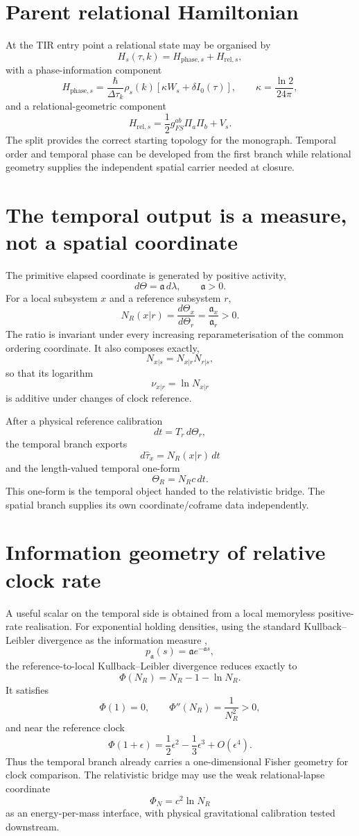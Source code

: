 \section{Parent relational Hamiltonian}

At the TIR entry point a relational state may be organised by
\[
H_s(\tau,k)=H_{\mathrm{phase},s}+H_{\mathrm{rel},s},
\]
with a phase-information component
\[
H_{\mathrm{phase},s}
=
\frac{\hbar}{\Delta\tau_k}\rho_s(k)
\left[\kappa W_s+\delta I_0(\tau)\right],
\qquad
\kappa=\frac{\ln2}{24\pi},
\]
and a relational-geometric component
\[
H_{\mathrm{rel},s}
=
\frac12 g_{FS}^{ab}\Pi_a\Pi_b+V_s.
\]
The split provides the correct starting topology for the monograph. Temporal order and temporal phase can be developed from the first branch while relational geometry supplies the independent spatial carrier needed at closure.

\section{The temporal output is a measure, not a spatial coordinate}

The primitive elapsed coordinate is generated by positive activity,
\[
d\Theta=\mathfrak a\,d\lambda,
\qquad \mathfrak a>0.
\]
For a local subsystem \(x\) and a reference subsystem \(r\),
\[
N_R(x|r)
=
\frac{d\Theta_x}{d\Theta_r}
=
\frac{\mathfrak a_x}{\mathfrak a_r}>0.
\]
The ratio is invariant under every increasing reparameterisation of the common ordering coordinate. It also composes exactly,
\[
N_{x|s}=N_{x|r}N_{r|s},
\]
so that its logarithm
\[
\nu_{x|r}=\ln N_{x|r}
\]
is additive under changes of clock reference.

After a physical reference calibration
\[
dt=T_r\,d\Theta_r,
\]
the temporal branch exports
\[
d\widehat\tau_x=N_R(x|r)\,dt
\]
and the length-valued temporal one-form
\[
\boxed{
\Theta_R=N_Rc\,dt.
}
\]
This one-form is the temporal object handed to the relativistic bridge. The spatial branch supplies its own coordinate/coframe data independently.

\section{Information geometry of relative clock rate}

A useful scalar on the temporal side is obtained from a local memoryless positive-rate realisation. For exponential holding densities, using the standard Kullback--Leibler divergence as the information measure \cite{KullbackLeibler1951},
\[
p_{\mathfrak a}(s)=\mathfrak a e^{-\mathfrak a s},
\]
the reference-to-local Kullback--Leibler divergence reduces exactly to
\[
\boxed{
\Phi(N_R)=N_R-1-\ln N_R.
}
\]
It satisfies
\[
\Phi(1)=0,
\qquad
\Phi''(N_R)=\frac{1}{N_R^2}>0,
\]
and near the reference clock
\[
\Phi(1+\epsilon)
=
\frac12\epsilon^2-\frac13\epsilon^3+O(\epsilon^4).
\]
Thus the temporal branch already carries a one-dimensional Fisher geometry for clock comparison. The relativistic bridge may use the weak relational-lapse coordinate
\[
\Phi_N=c^2\ln N_R
\]
as an energy-per-mass interface, with physical gravitational calibration tested downstream.

